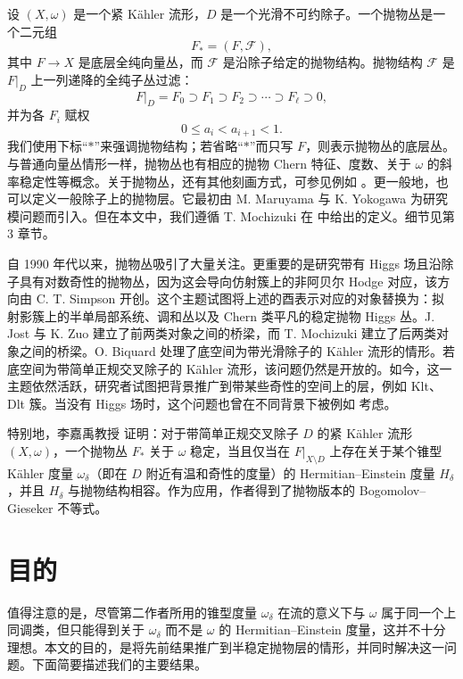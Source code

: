 设 \((X,\omega)\) 是一个紧 Kähler 流形，\(D\) 是一个光滑不可约除子。一个抛物丛是一个二元组
\[
F_*=(F,\mathcal F),
\]
其中 \(F\to X\) 是底层全纯向量丛，而 \(\mathcal F\) 是沿除子给定的抛物结构。抛物结构 \(\mathcal F\) 是 \(F|_D\) 上一列递降的全纯子丛过滤：
\[
F|_D = F_0 \supset F_1 \supset F_2 \supset \cdots \supset F_\ell \supset 0,
\]
并为各 \(F_i\) 赋权
\[
0\le a_i < a_{i+1} <1.
\]
我们使用下标“\(*\)”来强调抛物结构；若省略“\(*\)”而只写 \(F\)，则表示抛物丛的底层丛。与普通向量丛情形一样，抛物丛也有相应的抛物 Chern 特征、度数、关于 \(\omega\) 的斜率稳定性等概念。关于抛物丛，还有其他刻画方式，可参见例如 \cite{Bw,Iy-Si,Mo2}。更一般地，也可以定义一般除子上的抛物层。它最初由 M. Maruyama 与 K. Yokogawa \cite{Ma-Yo} 为研究模问题而引入。但在本文中，我们遵循 T. Mochizuki 在 \cite[Chapter 3]{Mo1} 中给出的定义。细节见第 3 章节。

自 1990 年代以来，抛物丛吸引了大量关注。更重要的是研究带有 Higgs 场且沿除子具有对数奇性的抛物丛，因为这会导向仿射簇上的非阿贝尔 Hodge 对应，该方向由 C. T. Simpson \cite{Si1} 开创。这个主题试图将上述的酉表示对应的对象替换为：拟射影簇上的半单局部系统、调和丛以及 Chern 类平凡的稳定抛物 Higgs 丛。J. Jost 与 K. Zuo \cite{Jo-Ka} 建立了前两类对象之间的桥梁，而 T. Mochizuki \cite{Mo3} 建立了后两类对象之间的桥梁。O. Biquard \cite{Bi} 处理了底空间为带光滑除子的 Kähler 流形的情形。若底空间为带简单正规交叉除子的 Kähler 流形，该问题仍然是开放的。如今，这一主题依然活跃，研究者试图把背景推广到带某些奇性的空间上的层，例如 Klt、Dlt 簇。当没有 Higgs 场时，这个问题也曾在不同背景下被例如 \cite{Li,Li-Na,St-Wr} 考虑。

特别地，李嘉禹教授 \cite{Li} 证明：对于带简单正规交叉除子 \(D\) 的紧 Kähler 流形 \((X,\omega)\)，一个抛物丛 \(F_*\) 关于 \(\omega\) 稳定，当且仅当在 \(F|_{X\setminus D}\) 上存在关于某个锥型 Kähler 度量 \(\omega_\delta\)（即在 \(D\) 附近有温和奇性的度量）的 Hermitian--Einstein 度量 \(H_\delta\)，并且 \(H_\delta\) 与抛物结构相容。作为应用，作者得到了抛物版本的 Bogomolov--Gieseker 不等式。

\section{目的}

值得注意的是，尽管第二作者所用的锥型度量 \(\omega_\delta\) 在流的意义下与 \(\omega\) 属于同一个上同调类，但只能得到关于 \(\omega_\delta\) 而不是 \(\omega\) 的 Hermitian--Einstein 度量，这并不十分理想。本文的目的，是将先前结果推广到半稳定抛物层的情形，并同时解决这一问题。下面简要描述我们的主要结果。

